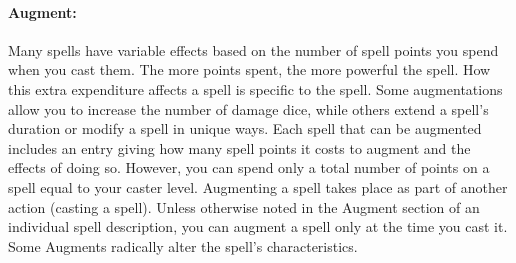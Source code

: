 \documentclass[../VancianToPsionics.tex]{subfiles}
\begin{document}
\paragraph[Augment]{Augment:} 
\label{sec:Augment}
Many spells have variable effects based on the number of spell points you spend when you cast them. The more points spent, the more powerful the spell. How this extra expenditure affects a spell is specific to the spell. Some augmentations allow you to increase the number of damage dice, while others extend a spell's duration or modify a spell in unique ways. Each spell that can be augmented includes an entry giving how many spell points it costs to augment and the effects of doing so. However, you can spend only a total number of points on a spell equal to your caster level.
Augmenting a spell takes place as part of another action (casting a spell). Unless otherwise noted in the Augment section of an individual spell description, you can augment a spell only at the time you cast it. Some Augments radically alter the spell's characteristics.
\end{document}

